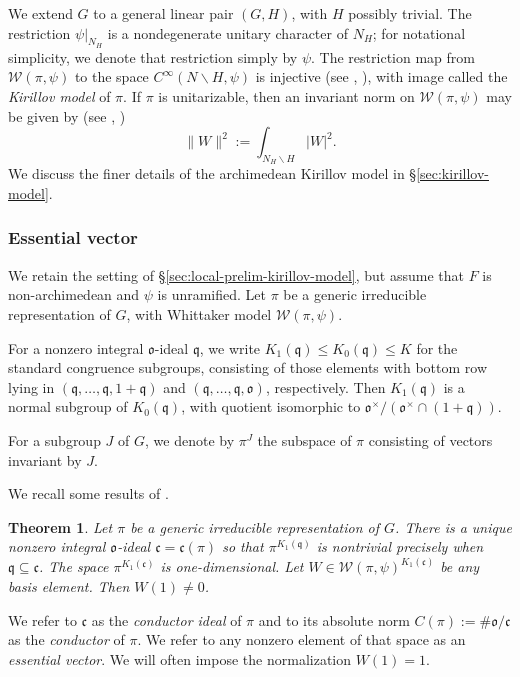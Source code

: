 \documentclass[reqno]{amsart}
\theoremstyle{plain} \newtheorem{theorem} {Theorem}
\theoremstyle{definition} \newtheorem{definition} [theorem] {Definition}
\theoremstyle{itplain} %
\numberwithin{equation}{section}
\numberwithin{theorem}{section}
\renewcommand{\leq}{\leqslant}
\begin{document}
We extend $G$ to a general linear pair $(G,H)$, with $H$ possibly trivial.  The restriction $\psi|_{N_H}$ is a nondegenerate unitary character of $N_H$; for notational simplicity, we denote that restriction simply by $\psi$.  The restriction map from $\mathcal{W}(\pi,\psi)$ to the space $C^\infty(N \backslash H, \psi)$ is injective (see \cite[\S6.5]{MR748505}, \cite[\S10.2]{MR1999922}), with image called the \emph{Kirillov model} of $\pi$.  If $\pi$ is unitarizable, then an invariant norm on $\mathcal{W}(\pi,\psi)$ may be given by (see \cite[\S6.4]{MR748505}, \cite[\S10.2]{MR1999922})
\begin{equation*}
  \|W\|^2 := \int _{N_H \backslash H} |W|^2.
\end{equation*}
We discuss the finer details of the archimedean Kirillov model in \S\ref{sec:kirillov-model}.

\subsubsection{Essential vector}\label{sec:essential-vector}
We retain the setting of \S\ref{sec:local-prelim-kirillov-model}, but assume that $F$ is non-archimedean and $\psi$ is unramified.  Let $\pi$ be a generic irreducible representation of $G$, with Whittaker model $\mathcal{W}(\pi,\psi)$.

For a nonzero integral $\mathfrak{o}$-ideal $\mathfrak{q}$, we write $K_1(\mathfrak{q}) \leq K_0(\mathfrak{q}) \leq K$ for the standard congruence subgroups, consisting of those elements with bottom row lying in $(\mathfrak{q},\dotsc,\mathfrak{q},1 + \mathfrak{q})$ and $(\mathfrak{q},\dotsc,\mathfrak{q},\mathfrak{o})$, respectively.  Then $K_1(\mathfrak{q})$ is a normal subgroup of $K_0(\mathfrak{q})$, with quotient isomorphic to $\mathfrak{o}^\times / (\mathfrak{o}^\times \cap (1 + \mathfrak{q}))$.

For a subgroup $J$ of $G$, we denote by $\pi^J$ the subspace of $\pi$ consisting of vectors invariant by $J$.

We recall some results of \cite{MR620708, MR3138844, MR3001803}.
\begin{theorem}
  Let $\pi$ be a generic irreducible representation of $G$.  There is a unique nonzero integral $\mathfrak{o}$-ideal $\mathfrak{c} = \mathfrak{c}(\pi)$ so that $\pi^{K_1(\mathfrak{q})}$ is nontrivial precisely when $\mathfrak{q} \subseteq \mathfrak{c}$.  The space $\pi^{K_1(\mathfrak{c})}$ is one-dimensional.  Let $W \in \mathcal{W}(\pi,\psi)^{K_1(\mathfrak{c})}$ be any basis element.  Then $W(1) \neq 0$.
\end{theorem}
We refer to $\mathfrak{c}$ as the \emph{conductor ideal} of $\pi$ and to its absolute norm $C(\pi) := \# \mathfrak{o} / \mathfrak{c}$ as the \emph{conductor} of $\pi$.  We refer to any nonzero element of that space as an \emph{essential vector}.  We will often impose the normalization $W(1) = 1$.
\end{document}
